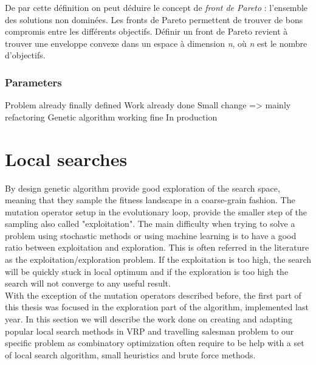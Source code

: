 \documentclass[12pt]{memoir}
\begin{document}

De par cette définition on peut déduire le concept de \emph{front de
Pareto} : l'ensemble des solutions non dominées. Les fronts de Pareto
permettent de trouver de bons compromis entre les différents objectifs.
Définir un front de Pareto revient à trouver une enveloppe convexe\cite{godfrey2007algorithms} dans
un espace à dimension \textit{n}, où \textit{n} est le nombre d'objectifs.

\label{par:Multi-objective selection }

\subsubsection{Parameters} %
\label{ssub:Parameter}

Problem already finally defined 
Work already done
Small change => mainly refactoring
Genetic algorithm working fine 
In production

\section{Local searches}
By design genetic algorithm provide good exploration of the search space, meaning that they sample the fitness landscape in a coarse-grain fashion.
The mutation operator setup in the evolutionary loop, provide the smaller step of the sampling also called "exploitation". The main difficulty when trying to 
solve a problem using stochastic methods or using machine learning is to have a good ratio between exploitation and exploration. This is often referred in the literature as the exploitation/exploration problem. If the exploitation is too high, the search will be quickly stuck in local optimum and if the exploration is too high the search will not converge to any useful result. \\
With the exception of the mutation operators described before, the first part of this thesis was focused in the exploration part of the algorithm, implemented last year. In this section we will describe the work done on creating and adapting popular local search methods in VRP and travelling salesman problem to our specific problem as combinatory optimization often require to be help with a set of local search algorithm, small heuristics and brute force methods.
\end{document}
